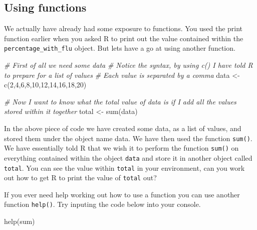 \documentclass[
]{book}
\newenvironment{Shaded}{\begin{snugshade}}{\end{snugshade}}
\newcommand{\CommentTok}[1]{\textcolor[rgb]{0.56,0.35,0.01}{\textit{#1}}}
\newcommand{\DecValTok}[1]{\textcolor[rgb]{0.00,0.00,0.81}{#1}}
\newcommand{\FunctionTok}[1]{\textcolor[rgb]{0.00,0.00,0.00}{#1}}
\newcommand{\NormalTok}[1]{#1}
\newcommand{\OtherTok}[1]{\textcolor[rgb]{0.56,0.35,0.01}{#1}}
\begin{document}
\hypertarget{using-functions}{%
\subsection{Using functions}\label{using-functions}}

We actually have already had some exposure to functions. You used the print function earlier when you asked R to print out the value contained within the \texttt{percentage\_with\_flu} object. But lets have a go at using another function.

\begin{Shaded}
\begin{Highlighting}[]
\CommentTok{\# First of all we need some data}
\CommentTok{\# Notice the syntax, by using c() I have told R to prepare for a list of values}
\CommentTok{\# Each value is separated by a comma}
\NormalTok{data }\OtherTok{\textless{}{-}} \FunctionTok{c}\NormalTok{(}\DecValTok{2}\NormalTok{,}\DecValTok{4}\NormalTok{,}\DecValTok{6}\NormalTok{,}\DecValTok{8}\NormalTok{,}\DecValTok{10}\NormalTok{,}\DecValTok{12}\NormalTok{,}\DecValTok{14}\NormalTok{,}\DecValTok{16}\NormalTok{,}\DecValTok{18}\NormalTok{,}\DecValTok{20}\NormalTok{)}

\CommentTok{\# Now I want to know what the total value of data is if I add all the values stored within it together}
\NormalTok{total }\OtherTok{\textless{}{-}} \FunctionTok{sum}\NormalTok{(data)}
\end{Highlighting}
\end{Shaded}

In the above piece of code we have created some data, as a list of values, and stored them under the object name data. We have then used the function \texttt{sum()}. We have essentially told R that we wish it to perform the function \texttt{sum()} on everything contained within the object \texttt{data} and store it in another object called \texttt{total}. You can see the value within \texttt{total} in your environment, can you work out how to get R to print the value of \texttt{total} out?

If you ever need help working out how to use a function you can use another function \texttt{help()}. Try inputing the code below into your console.

\begin{Shaded}
\begin{Highlighting}[]
\FunctionTok{help}\NormalTok{(sum)}
\end{Highlighting}
\end{Shaded}
\end{document}
